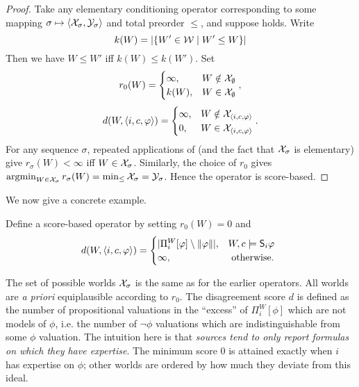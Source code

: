 \begin{proof}
    Take any elementary conditioning operator corresponding to some mapping
    $\sigma \mapsto \langle {\mathcal{X}_\sigma, \mathcal{Y}_\sigma} \rangle$ and total preorder $\le$, and
    suppose \kconj{} holds. Write
    \[
        k(W) = |\{W' \in \mathcal{W} \mid W' \le W\}|
    \]
    Then we have $W \le W'$ iff $k(W) \le k(W')$. Set
    \[
        r_0(W) = \begin{cases}
            \infty,& W \notin \mathcal{X}_\emptyset \\
            k(W),& W \in \mathcal{X}_\emptyset
        \end{cases},
    \]
    \[
        d(W, \langle {i, c, \varphi} \rangle) = \begin{cases}
            \infty,& W \notin \mathcal{X}_{\langle {i, c, \varphi} \rangle} \\
            0,& W \in \mathcal{X}_{\langle {i, c, \varphi} \rangle} \\
        \end{cases}.
    \]
    For any sequence $\sigma$, repeated applications of \kconj{} (and the fact
    that $\mathcal{X}_\sigma$ is elementary) give $r_\sigma(W) < \infty$ iff $W \in
    \mathcal{X}_\sigma$. Similarly, the choice of $r_0$ gives $\argmin_{W \in
    \X_\sigma}{r_\sigma(W)} = \min_{\le}{\X_\sigma} = \Y_\sigma$. Hence the
    operator is score-based.
\end{proof}

We now give a concrete example.

\begin{definition}
    \label{kr_def_scorebasedop}
    Define a score-based operator \scorebasedop{} by setting
    $r_0(W) = 0$ and
    \[
        d(W, \langle {i, c, \varphi} \rangle) = \begin{cases}
            |\Pi^W_i[\varphi] \setminus \|{\varphi}\||,& W, c \models \mathsf{S}_i\varphi \\
            \infty,& \text{ otherwise. }
        \end{cases}
    \]
\end{definition}

The set of possible worlds $\mathcal{X}_\sigma$ is the same as for the earlier
operators.
All worlds are \emph{a priori} equiplausible according to
$r_0$. The disagreement score $d$ is defined as the number of propositional
valuations in the ``excess'' of $\Pi^W_i[\phi]$ which are not models of
$\phi$, i.e. the number of $\neg\phi$ valuations which are indistinguishable
from some $\phi$ valuation.
%
The intuition here is that \emph{sources tend to only report formulas on which
they have expertise}. The minimum score 0 is attained exactly when $i$ has
expertise on $\phi$; other worlds are ordered by how much they deviate from
this ideal.

